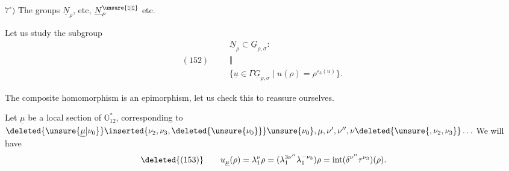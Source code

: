 
$7^\circ)$ The groups $\underline N_\rho$,  etc, $\underline N_\rho^{\unsure{\natural|\sharp}}$ etc.

Let us study the subgroup
\[
(152)\qquad
\begin{gathered}
\underline N_\rho\subset\underline G_{\rho,\sigma}:\\[-2pt]
\Vert\\[-2pt]
\{\underline u\in\Gamma\underline G_{\rho,\sigma}\mid u(\rho)=\rho^{\varepsilon_3(\underline u)}\}.
\end{gathered}
\]

 The composite homomorphism
is an epimorphism,  let us check this to reassure ourselves.

Let $\underline\mu$ be a local section of $\mathbb O_{12}^{*}$, corresponding to
$\deleted{\unsure{\underline\mu|\nu_0}}\inserted{\nu_2,\nu_3,\deleted{\unsure{\nu_0}}}\unsure{\nu_0},\mu,\nu',\nu'',\nu\deleted{\unsure{,\nu_2,\nu_3}}\ldots$
We will have
\[
\deleted{(153)}\qquad
u_{\underline\mu}(\rho)=\lambda_1^\nu\rho
=(\lambda_1^{3\nu''}\lambda_1^{-\nu_3})\rho
=\operatorname{int}(\delta^{\nu''}\tau^{\nu_3})(\rho).
\]

